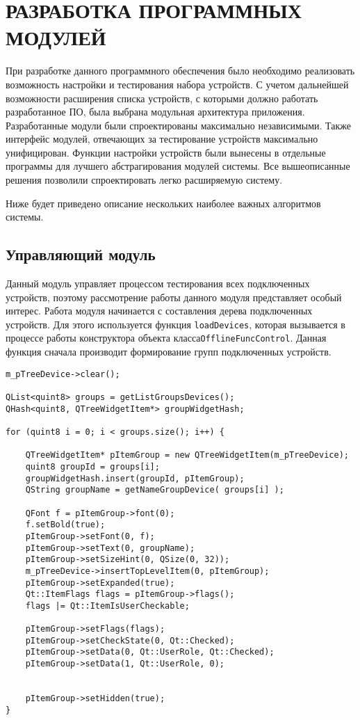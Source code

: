 \section{РАЗРАБОТКА ПРОГРАММНЫХ МОДУЛЕЙ}
\label{sec:modules}

При разработке данного программного обеспечения было необходимо реализовать возможность настройки и тестирования
набора устройств. С учетом дальнейшей возможности расширения списка устройств, с которыми должно работать разработанное
ПО, была выбрана модульная архитектура приложения. Разработанные модули были спроектированы максимально независимыми.
Также интерфейс модулей, отвечающих за тестирование устройств максимально унифицирован. Функции настройки устройств были
вынесены в отдельные программы для лучшего абстрагирования модулей системы. Все вышеописанные решения
позволили спроектировать легко расширяемую систему.

Ниже будет приведено описание нескольких наиболее важных алгоритмов системы.

\subsection{Управляющий модуль}
Данный модуль управляет процессом тестирования всех подключенных устройств, поэтому рассмотрение работы данного модуля
представляет особый интерес.
Работа модуля начинается с составления дерева подключенных устройств. Для этого используется функция
\texttt{loadDevices}, которая вызывается в процессе работы конструктора объекта класса\break \texttt{OfflineFuncControl}.
Данная функция сначала производит формирование групп подключенных устройств.

\medskip
\begin{verbatim}
m_pTreeDevice->clear();

QList<quint8> groups = getListGroupsDevices();
QHash<quint8, QTreeWidgetItem*> groupWidgetHash;

for (quint8 i = 0; i < groups.size(); i++) {

	QTreeWidgetItem* pItemGroup = new QTreeWidgetItem(m_pTreeDevice);
	quint8 groupId = groups[i];
	groupWidgetHash.insert(groupId, pItemGroup);
	QString groupName = getNameGroupDevice( groups[i] );

	QFont f = pItemGroup->font(0);
	f.setBold(true);
	pItemGroup->setFont(0, f);
	pItemGroup->setText(0, groupName);
	pItemGroup->setSizeHint(0, QSize(0, 32));
	m_pTreeDevice->insertTopLevelItem(0, pItemGroup);
	pItemGroup->setExpanded(true);
	Qt::ItemFlags flags = pItemGroup->flags();
	flags |= Qt::ItemIsUserCheckable;

	pItemGroup->setFlags(flags);
	pItemGroup->setCheckState(0, Qt::Checked);
	pItemGroup->setData(0, Qt::UserRole, Qt::Checked);
	pItemGroup->setData(1, Qt::UserRole, 0);


	pItemGroup->setHidden(true);
}
\end{verbatim}
\medskip

